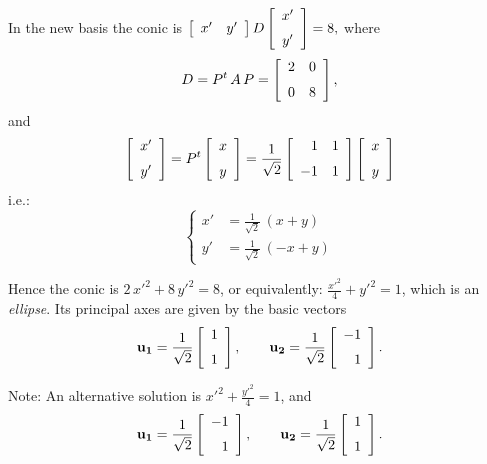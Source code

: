 \documentclass[12pt]{article}
\begin{document}
{In the new basis the conic is 
$\displaystyle{
\left [\begin{array}{cc} x'&y'\end{array}\right ]
D
\left [\begin {array}{c} x'\\\noalign{\medskip}y'\end {array}\right ]
= 8},$
where 
\[
D = P^{t}\,A\,P =
\left [\begin {array}{cc} 2&0\\\noalign{\medskip}0&8\end {array}
\right ],
\]
and
\[
\left [\begin {array}{c} x'\\\noalign{\medskip}y'\end {array}\right ]
=
P^{t} 
\left [\begin {array}{c} x\\\noalign{\medskip}y\end {array}\right ]
=
\frac{1}{\sqrt{2}}
\left [\begin {array}{rr} 1&1\\
\noalign{\medskip}-1&1\end {array}\right ]
\left [\begin {array}{c} x\\\noalign{\medskip}y\end {array}\right ]
\]
i.e.:
\[
\left\{
\begin{aligned}
x' &= \tfrac{1}{\sqrt{2}}\,\left(x+y\right)\\
y' &= \tfrac{1}{\sqrt{2}}\,\left(-x+y\right)
\end{aligned}
\right.
\]

Hence the conic is $2\,{x'}^2+8\,{y'}^2 = 8$, or equivalently:
$\displaystyle{
\frac{{x'}^2}{4} + {y'}^2 = 1
}$, which is an \emph{ellipse}.
Its principal axes are given by the basic vectors
\[
\mathbf{u_1} = \frac{1}{\sqrt{2}}
\left [\begin {array}{r} 1
\\\noalign{\medskip}1\end {array}\right ] , \qquad
\mathbf{u_2} = \frac{1}{\sqrt{2}}
\left [\begin {array}{r} -1
\\\noalign{\medskip}1\end {array}\right ] .
\]

Note: An alternative solution is 
$\displaystyle{
{x'}^2 + \frac{{y'}^2}{4}  = 1
}$, and
\[
\mathbf{u_1} = \frac{1}{\sqrt{2}}
\left [\begin {array}{r} -1
\\\noalign{\medskip}1\end {array}\right ] , \qquad
\mathbf{u_2} = \frac{1}{\sqrt{2}}
\left [\begin {array}{r} 1
\\\noalign{\medskip}1\end {array}\right ] .
\]


}
\end{document}
